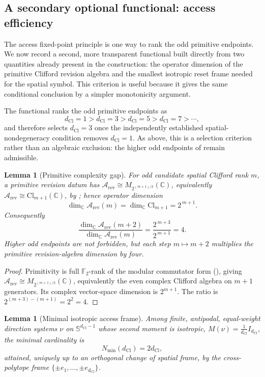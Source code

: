 \documentclass[11pt]{article}
\newtheorem{lemma}[theorem]{Lemma}
\theoremstyle{definition}
\theoremstyle{remark}
\newcommand{\C}{\mathbb{C}}
\newcommand{\F}{\mathbb{F}}
\newcommand{\Arev}{\mathcal{A}_{\mathrm{rev}}}
\newcommand{\Cl}{\mathrm{Cl}}
\newcommand{\dCl}{d_{\mathrm{Cl}}}
\newcommand{\Sphere}{\mathbb{S}}
\begin{document}
\subsection{A secondary optional functional: access efficiency}
\label{subsec:access-efficiency}

The access fixed-point principle is one way to rank the odd primitive
endpoints.  We now record a second, more transparent functional built directly
from two quantities already present in the construction: the operator dimension
of the primitive Clifford revision algebra and the smallest isotropic reset
frame needed for the spatial symbol.  This criterion is useful because it gives
the same conditional conclusion by a simpler monotonicity argument.

The functional ranks the odd primitive endpoints as
\[
  \dCl=1 > \dCl=3 > \dCl=5 > \dCl=7 > \cdots,
\]
and therefore selects \(\dCl=3\) once the independently established
spatial-nondegeneracy condition removes \(\dCl=1\).  As above, this is a
selection criterion rather than an algebraic exclusion: the higher odd endpoints
of  remain admissible.

\begin{lemma}[Primitive complexity gap]
\label{lem:complexity-gap}
For odd candidate spatial Clifford rank \(m\), a primitive revision datum has
\(\Arev\cong M_{2^{(m+1)/2}}(\C)\), equivalently
\(\Arev\cong\Cl_{m+1}(\C)\), by ; hence operator
dimension
\[
  \dim_\C\Arev(m)=\dim_\C\Cl_{m+1}=2^{\,m+1}.
\]
Consequently
\[
  \frac{\dim_\C\Arev(m+2)}{\dim_\C\Arev(m)}
  =\frac{2^{\,m+3}}{2^{\,m+1}}=4 .
\]
Higher odd endpoints are not forbidden, but each step \(m\mapsto m+2\) multiplies
the primitive revision-algebra dimension by four.
\end{lemma}

\begin{proof}
Primitivity is full \(\F_2\)-rank of the modular commutator form
(), giving
\(\Arev\cong M_{2^{(m+1)/2}}(\C)\), equivalently the even complex Clifford
algebra on \(m+1\) generators.  Its complex vector-space dimension is
\(2^{m+1}\).  The ratio is
\(2^{(m+3)-(m+1)}=2^2=4\).
\end{proof}

\begin{lemma}[Minimal isotropic access frame]
\label{lem:minimal-frame}
Among finite, antipodal, equal-weight direction systems \(\nu\) on
\(\Sphere^{\dCl-1}\) whose second moment is isotropic,
\(M(\nu)=\tfrac1{\dCl} I_{\dCl}\), the minimal cardinality is
\[
  N_{\min}(\dCl)=2\dCl,
\]
attained, uniquely up to an orthogonal change of spatial frame, by the
cross-polytope frame \(\{\pm e_1,\dots,\pm e_{\dCl}\}\).
\end{lemma}
\end{document}
